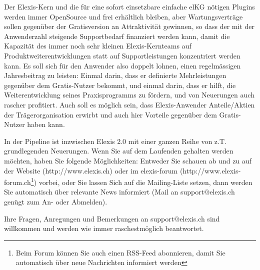 \documentclass[a4paper]{scrartcl}
\begin{document}
Der Elexis-Kern und die für eine sofort einsetzbare einfache elKG nötigen Plugins werden immer OpenSource und frei erhältlich bleiben, aber Wartungsverträge sollen gegenüber der Gratisversion an Attraktivität gewinnen, so dass der mit der Anwenderzahl steigende Supportbedarf finanziert werden kann, damit die Kapazität des immer noch sehr kleinen Elexis-Kernteams auf Produktweiterentwicklungen statt auf Supportleistungen konzentriert werden kann. Es soll sich für den Anwender also doppelt lohnen, einen regelmässigen Jahresbeitrag zu leisten: Einmal darin, dass er definierte Mehrleistungen gegenüber dem Gratis-Nutzer bekommt, und einmal darin, dass er hilft, die Weiterentwicklung seines Praxisprogramms zu fördern, und von Neuerungen auch rascher profitiert. Auch soll es möglich sein, dass Elexis-Anwender Anteile/Aktien der Trägerorganisation erwirbt und auch hier Vorteile gegenüber dem Gratis-Nutzer haben kann.

\medskip

In der Pipeline ist inzwischen Elexis 2.0 mit einer ganzen Reihe von z.T. grundlegenden Neuerungen. Wenn Sie auf dem Laufenden gehalten werden möchten, haben Sie folgende Möglichkeiten: Entweder Sie schauen ab und zu auf der Website (http://www.elexis.ch) oder im elexis-forum (http://www.elexis-forum.ch\footnote{Beim Forum können Sie auch einen RSS-Feed abonnieren, damit Sie automatisch über neue Nachrichten informiert werden}) vorbei, oder Sie lassen Sich auf die Mailing-Liste setzen, dann werden Sie automatisch über relevante News informiert (Mail an support$@$elexis.ch genügt zum An- oder Abmelden).

\medskip

Ihre Fragen, Anregungen und Bemerkungen an support$@$elexis.ch sind willkommen und werden wie immer raschestmöglich beantwortet.
\end{document}
